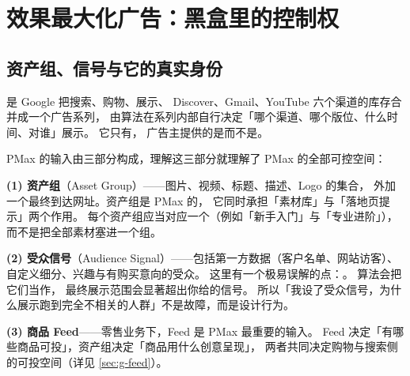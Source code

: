 \section{效果最大化广告：黑盒里的控制权}
\label{sec:g-pmax}

\subsection{资产组、信号与它的真实身份}

 是 Google 把搜索、购物、展示、
Discover、Gmail、YouTube 六个渠道的库存合并成一个广告系列，
由算法在系列内部自行决定「哪个渠道、哪个版位、什么时间、对谁」展示。
它只有，
广告主提供的是而不是。

PMax 的输入由三部分构成，理解这三部分就理解了 PMax 的全部可控空间：

\textbf{(1) 资产组}（Asset Group）——图片、视频、标题、描述、Logo 的集合，
外加一个最终到达网址。资产组是 PMax 的，
它同时承担「素材库」与「落地页提示」两个作用。
每个资产组应当对应一个（例如「新手入门」与「专业进阶」），
而不是把全部素材塞进一个组。

\textbf{(2) 受众信号}（Audience Signal）——包括第一方数据（客户名单、网站访客）、
自定义细分、兴趣与有购买意向的受众。
这里有一个极易误解的点：。
算法会把它们当作，
最终展示范围会显著超出你给的信号。
所以「我设了受众信号，为什么展示跑到完全不相关的人群」不是故障，而是设计行为。

\textbf{(3) 商品 Feed}——零售业务下，Feed 是 PMax 最重要的输入。
Feed 决定「有哪些商品可投」，资产组决定「商品用什么创意呈现」，
两者共同决定购物与搜索侧的可投空间（详见 \cref{sec:g-feed}）。

